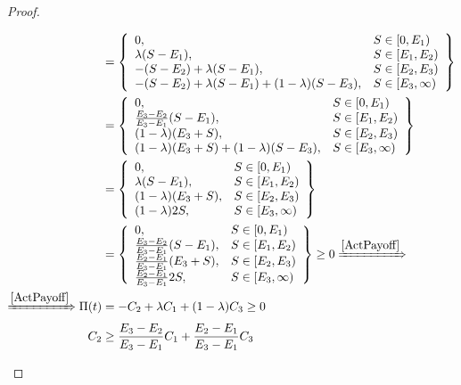\begin{proof}
\begin{enumerate}
\begin{align*}
            &=\left\{
            \begin{array}{ll}
              0,       & S\in [0,E_1) \\
              \lambda(S-E_1),        & S\in [E_1,E_2) \\
              - (S-E_2) +\lambda(S-E_1),        & S\in [E_2,E_3) \\
              - (S-E_2) +\lambda(S-E_1) + (1-\lambda)(S-E_3),        & S\in [E_3,\infty)
            \end{array}
            \right\} \\
            &=\left\{
            \begin{array}{ll}
              0,       & S\in [0,E_1) \\
              \frac{E_3-E_2}{E_3-E_1}(S-E_1),        & S\in [E_1,E_2) \\
              (1-\lambda)(E_3+S),        & S\in [E_2,E_3) \\
              (1-\lambda)(E_3+S) + (1-\lambda)(S-E_3),        & S\in [E_3,\infty)
            \end{array}
            \right\} \\
            &=\left\{
            \begin{array}{ll}
              0,       & S\in [0,E_1) \\
              \lambda(S-E_1),        & S\in [E_1,E_2) \\
              (1-\lambda)(E_3+S),        & S\in [E_2,E_3) \\
              (1-\lambda)2S,        & S\in [E_3,\infty)
            \end{array}
            \right\} \\
            &=\left\{
            \begin{array}{ll}
              0,       & S\in [0,E_1) \\
              \frac{E_3-E_2}{E_3-E_1}(S-E_1),        & S\in [E_1,E_2) \\
              \frac{E_2-E_1}{E_3-E_1}(E_3+S),        & S\in [E_2,E_3) \\
              \frac{E_2-E_1}{E_3-E_1}2S,        & S\in [E_3,\infty)
            \end{array}
            \right\} \geq 0 \xRightarrow{\ref{ActPayoff}} \\
            \xRightarrow{\ref{ActPayoff}} \Pi(t) &= - C_2 + \lambda C_1 + (1-\lambda) C_3 \geq 0 \\
            C_2 &\geq \frac{E_3-E_2}{E_3-E_1} C_1 + \frac{E_2-E_1}{E_3-E_1} C_3
        \end{align*}
    \end{enumerate}
\end{proof}















